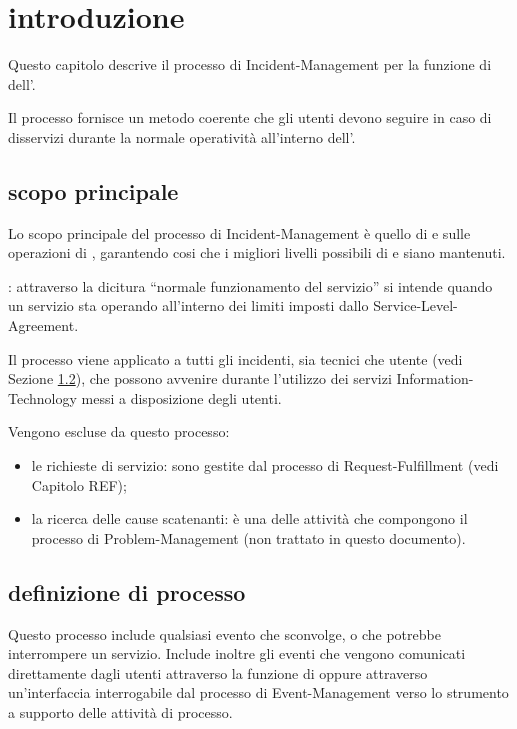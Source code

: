 %
%
\section[Introduzione]{introduzione}
\label{im-introduction}
Questo capitolo descrive il processo di \acf{Incident-Management} per la funzione di  dell'\entity{}.

Il processo fornisce un metodo coerente che gli utenti devono seguire in caso di disservizi durante la normale operatività all'interno dell'\entity{}.

\subsection[Scopo principale]{scopo principale}
\label{im-introduction-scope}
Lo scopo principale del processo di \ac{Incident-Management} è quello di  e  sulle operazioni di , garantendo cosi che i migliori livelli possibili di  e  siano mantenuti.

: attraverso la dicitura ``normale funzionamento del servizio'' si intende quando un servizio sta operando all'interno dei limiti imposti dallo \ac{Service-Level-Agreement}.

Il processo viene applicato a tutti gli incidenti, sia tecnici che utente (vedi Sezione \ref{im-introduction-definition}), che possono avvenire durante l'utilizzo dei servizi \acs{Information-Technology} messi a disposizione degli utenti.

Vengono escluse da questo processo:

\begin{itemize}
\item{le richieste di servizio: sono gestite dal processo di \acf{Request-Fulfillment} (vedi Capitolo REF);}
\item{la ricerca delle cause scatenanti: è una delle attività che compongono il processo di \acf{Problem-Management} (non trattato in questo documento).}
\end{itemize}

\subsection[Definizione di processo]{definizione di processo}
\label{im-introduction-definition}
Questo processo include qualsiasi evento che sconvolge, o che potrebbe interrompere un servizio. Include inoltre gli eventi che vengono comunicati direttamente dagli utenti attraverso la funzione di  oppure attraverso un'interfaccia interrogabile dal processo di \ac{Event-Management} verso lo strumento a supporto delle attività di processo.

